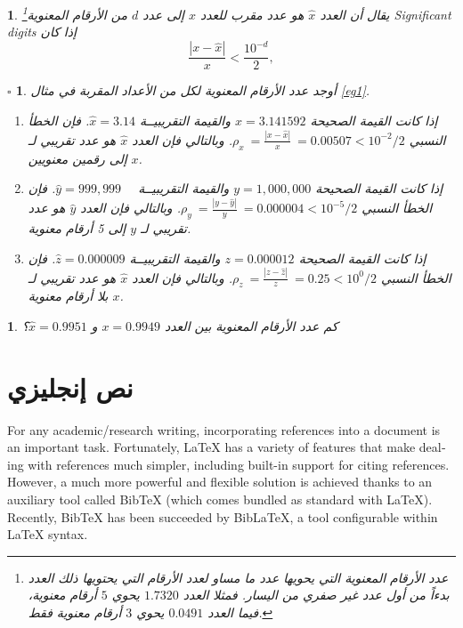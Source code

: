 \documentclass[a4 paper]{report}
\theoremstyle{mystyle}
\newtheorem{example}{$\square$ \arabicfonttt{\underline{مثال}}}[chapter]
\newtheorem{note}{\SquareShadowB\arabicfonttt {\underline{ ملاحظـة }}}[chapter]
\newtheorem{excercise}{\SquareShadowB\arabicfonttt {\underline{ تمرين }}}[chapter]
\theoremstyle{Excercises}
\newcommand{\eng}{\textenglish}  %
\begin{document}
\begin{note}
يقال أن العدد  $\hat{x}$  هو عدد مقرب\cite{ara1} للعدد $x$ إلى عدد $d$  من الأرقام المعنوية\footnote{عدد الأرقام المعنوية التي يحويها عدد ما مساو لعدد الأرقام التي يحتويها ذلك العدد بدءاً من أول عدد غير صفري من اليسار. فمثلا العدد $1.7320$ يحوي $5$ أرقام معنوية، فيما العدد $0.0491 $ يحوي $3$ أرقام معنوية فقط.}  \eng{Significant digits} إذا كان
\begin{equation}
\frac{|x-\hat{x}|}{x} < \frac{10^{-d}}{2},
\end{equation}
\end{note}
\begin{example}\label{eg3}
أوجد عدد الأرقام المعنوية لكل من الأعداد المقربة في مثال \ref{eg1}.\\
\begin{enumerate}
\item[أ -] إذا كانت القيمة الصحيحة $x = 3.141592$ والقيمة التقريبيــة $\hat{x} = 3.14$. فإن الخطأ النسبي $\rho_x \:= \frac{| x - \hat{x}|}{x} \: = 0.00507 < 10^{-2}/2$. وبالتالي فإن العدد $\hat{x}$ هو عدد تقريبي لـ $x$ إلى رقمين معنويين.
\item[ب -] إذا كانت القيمة الصحيحة $y = 1,000,000$ والقيمة التقريبيــة $\hat{y} = 999,999\quad $. فإن الخطأ النسبي $\rho_y \:= \frac{| y - \hat{y}|}{y} \: = 0.000004 < 10^{-5}/2$. وبالتالي فإن العدد $\hat{y}$ هو عدد تقريبي لـ $y$ إلى 5 أرقام معنوية.
\item[ج -] إذا كانت القيمة الصحيحة $z = 0.000012$ والقيمة التقريبيــة $\hat{z} = 0.000009$. فإن الخطأ النسبي $\rho_z \:= \frac{| z - \hat{z}|}{z} \: = 0.25 < 10^{0}/2$. وبالتالي فإن العدد $\hat{x}$ هو عدد تقريبي لـ $x$ بلا أرقام معنوية.
\end{enumerate}
\end{example}
\begin{excercise}
كم عدد الأرقام المعنوية بين العدد $x = 0.9949$  و $\hat{x}=0.9951$؟
\end{excercise} 

\section{نص إنجليزي}
\eng{For any academic/research writing, incorporating references into a document is an important task. Fortunately, LaTeX has a variety of features that make dealing with references much simpler, including built-in support for citing references. However, a much more powerful and flexible solution is achieved thanks to an auxiliary tool called BibTeX (which comes bundled as standard with LaTeX). Recently, BibTeX has been succeeded by BibLaTeX, a tool configurable within LaTeX syntax.}
\end{document}

